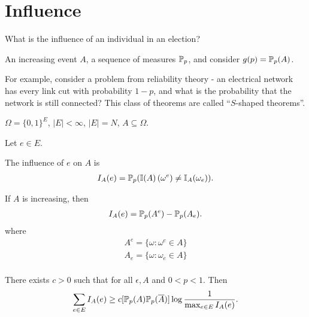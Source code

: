 \section{Influence}
\label{sec:influence}

\begin{question}
  What is the influence of an individual in an election?
\end{question}

\begin{question}
  An increasing event $A$, a sequence of measures $\Prob_{p}$, and
  consider $g(p) = \Prob_{p}(A)$.
\end{question}

For example, consider a problem from reliability theory - an
electrical network has every link cut with probability $1 - p$, and
what is the probability that the network is still connected? This
class of theorems are called ``$S$-shaped theorems''.

$\Omega = \{ 0, 1 \}^{E}$, $|E| < \infty$, $|E| = N$, $A \subseteq
\Omega$.

Let $e \in E$.

\begin{defn}
  \label{defn:random_walks_on_graphs:17}
  The influence of $e$ on $A$  is
  \begin{align}
    \label{eq:21}
    I_{A}(e) = \Prob_{p}(\I{A}(\omega^{e}) \neq \I_{A}(\omega_{e})).
  \end{align}

  If $A$ is increasing, then
  \begin{align}
    \label{eq:22}
    I_{A}(e) = \Prob_{p}(A^{e}) - \Prob_{p}(A_{e}).
  \end{align} where
  \begin{align}
    \label{eq:23}
    A^{e} = \{ \omega : \omega^{e} \in A \} \\
    A_{e} = \{ \omega : \omega_{e} \in A \} \\
  \end{align}
\end{defn}

\begin{thm}
  \label{defn:random_walks_on_graphs:18}
  There exists $c > 0$ such that for all $\epsilon, A$ and $0 < p <
  1$.  Then
  \begin{align}
    \label{eq:24}
    \sum_{e \in E} I_{A}(e) \geq c[\Prob_{p}(A)\Prob_{p}(\overline A)] \log
    \frac{1}{\max_{e \in E} I_{A}(e)}.
  \end{align}
\end{thm}

